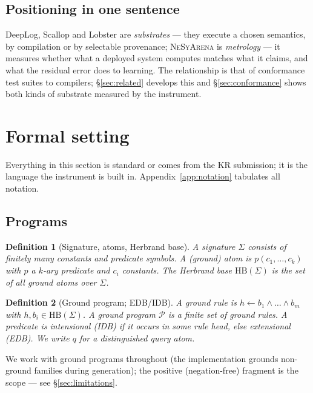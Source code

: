 \documentclass[10pt]{article}
\newtheorem{definition}{Definition}[section]
\theoremstyle{remark}
\newcommand{\HB}{\mathrm{HB}}
\begin{document}
\subsection{Positioning in one sentence}

DeepLog, Scallop and Lobster are \emph{substrates} --- they execute a chosen semantics, by
compilation or by selectable provenance; \textsc{NeSyArena} is \emph{metrology} --- it measures
whether what a deployed system computes matches what it claims, and what the residual error does to
learning. The relationship is that of conformance test suites to compilers; \S\ref{sec:related}
develops this and \S\ref{sec:conformance} shows both kinds of substrate measured by the instrument.

\section{Formal setting}\label{sec:setting}

Everything in this section is standard or comes from the KR submission; it is the language the
instrument is built in. Appendix~\ref{app:notation} tabulates all notation.

\subsection{Programs}

\begin{definition}[Signature, atoms, Herbrand base]
A \emph{signature} $\Sigma$ consists of finitely many constants and predicate symbols. A
\emph{(ground) atom} is $p(c_1,\dots,c_k)$ with $p$ a $k$-ary predicate and $c_i$ constants. The
\emph{Herbrand base} $\HB(\Sigma)$ is the set of all ground atoms over $\Sigma$.
\end{definition}

\begin{definition}[Ground program; EDB/IDB]\label{def:program}
A \emph{ground rule} is $h \leftarrow b_1 \wedge \dots \wedge b_m$ with $h, b_i \in \HB(\Sigma)$.
A \emph{ground program} $\mathcal{P}$ is a finite set of ground rules. A predicate is
\emph{intensional} (IDB) if it occurs in some rule head, else \emph{extensional} (EDB). We write
$q$ for a distinguished \emph{query atom}.
\end{definition}

We work with ground programs throughout (the implementation grounds non-ground families during
generation); the positive (negation-free) fragment is the scope --- see \S\ref{sec:limitations}.
\end{document}
